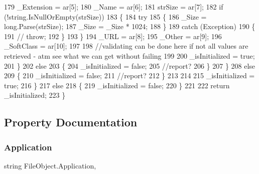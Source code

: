 \begin{DoxyCode}
179                     \_Extension = ar[5];
180                     \_Name = ar[6];
181                     strSize = ar[7];
182                     \textcolor{keywordflow}{if} (!\textcolor{keywordtype}{string}.IsNullOrEmpty(strSize))
183                     \{
184                         \textcolor{keywordflow}{try}
185                         \{
186                             \_Size = \textcolor{keywordtype}{long}.Parse(strSize);
187                             \_Size = \_Size * 1024;
188                         \}
189                         \textcolor{keywordflow}{catch} (Exception)
190                         \{
191                             \textcolor{comment}{// throw;}
192                         \}
193                     \}
194                     \_URL = ar[8];
195                     \_Other = ar[9];
196                     \_SoftClass = ar[10];
197 
198                     \textcolor{comment}{//validating can be done here if not all values are retrieved - atm see what we can get
       without failing}
199 
200                     \_isInitialized = \textcolor{keyword}{true};
201                 \}
202                 \textcolor{keywordflow}{else}
203                 \{
204                     \_isInitialized = \textcolor{keyword}{false};
205                     \textcolor{comment}{//report?}
206                 \}
207             \}
208             \textcolor{keywordflow}{else}
209             \{
210                 \_isInitialized = \textcolor{keyword}{false};
211                 \textcolor{comment}{//report?}
212             \}
213 
214 
215             \_isInitialized = \textcolor{keyword}{true};
216         \}
217         \textcolor{keywordflow}{else}
218         \{
219             \_isInitialized = \textcolor{keyword}{false};
220         \}
221         
222         \textcolor{keywordflow}{return} \_isInitialized;
223     \}
\end{DoxyCode}


\subsection{Property Documentation}
\mbox{\label{class_file_object_a39640cdc4b16ee66e9c73803f4510396}} 
\subsubsection{\texorpdfstring{Application}{Application}}
{\footnotesize\ttfamily string File\+Object.\+Application\hspace{0.3cm}{\ttfamily [get]}, {\ttfamily [set]}}



